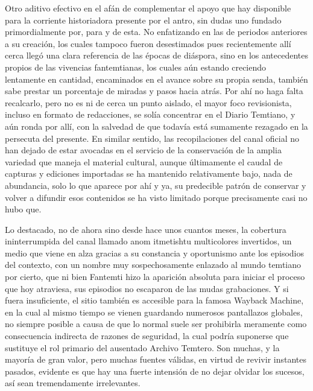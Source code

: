 \documentclass[
]{book}
\begin{document}
Otro aditivo efectivo en el afán de complementar el apoyo que hay disponible para la corriente historiadora presente por el antro, sin dudas uno fundado primordialmente por, para y de esta. No enfatizando en las de periodos anteriores a su creación, los cuales tampoco fueron desestimados pues recientemente allí cerca llegó una clara referencia de las épocas de diáspora, sino en los antecedentes propios de las vivencias fantemtianas, los cuales aún estando creciendo lentamente en cantidad, encaminados en el avance sobre su propia senda, también sabe prestar un porcentaje de miradas y pasos hacia atrás. Por ahí no haga falta recalcarlo, pero no es ni de cerca un punto aislado, el mayor foco revisionista, incluso en formato de redacciones, se solía concentrar en el Diario Temtiano, y aún ronda por allí, con la salvedad de que todavía está sumamente rezagado en la persecuta del presente. En similar sentido, las recopilaciones del canal oficial no han dejado de estar avocadas en el servicio de la conservación de la amplia variedad que maneja el material cultural, aunque últimamente el caudal de capturas y ediciones importadas se ha mantenido relativamente bajo, nada de abundancia, solo lo que aparece por ahí y ya, su predecible patrón de conservar y volver a difundir esos contenidos se ha visto limitado porque precisamente casi no hubo que.

Lo destacado, no de ahora sino desde hace unos cuantos meses, la cobertura ininterrumpida del canal llamado anom itmetishtu multicolores invertidos, un medio que viene en alza gracias a su constancia y oportunismo ante los episodios del contexto, con un nombre muy sospechosamente enlazado al mundo temtiano por cierto, que ni bien Fantemti hizo la aparición absoluta para iniciar el proceso que hoy atraviesa, sus episodios no escaparon de las mudas grabaciones. Y si fuera insuficiente, el sitio también es accesible para la famosa Wayback Machine, en la cual al mismo tiempo se vienen guardando numerosos pantallazos globales, no siempre posible a causa de que lo normal suele ser prohibirla meramente como consecuencia indirecta de razones de seguridad, la cual podría suponerse que sustituye el rol primario del ausentado Archivo Temtero. Son muchas, y la mayoría de gran valor, pero muchas fuentes válidas, en virtud de revivir instantes pasados, evidente es que hay una fuerte intensión de no dejar olvidar los sucesos, así sean tremendamente irrelevantes.
\end{document}
